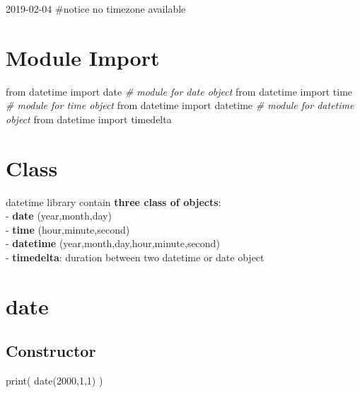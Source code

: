 \documentclass[
]{book}
\newenvironment{Shaded}{\begin{snugshade}}{\end{snugshade}}
\newcommand{\BuiltInTok}[1]{#1}
\newcommand{\CommentTok}[1]{\textcolor[rgb]{0.37,0.37,0.37}{\textit{#1}}}
\newcommand{\DecValTok}[1]{\textcolor[rgb]{0.06,0.06,0.06}{#1}}
\newcommand{\ImportTok}[1]{#1}
\newcommand{\NormalTok}[1]{#1}
\begin{document}
2019-02-04 \#notice no timezone available

\hypertarget{module-import}{%
\section{Module Import}\label{module-import}}

\begin{Shaded}
\begin{Highlighting}[]
\ImportTok{from}\NormalTok{ datetime }\ImportTok{import}\NormalTok{ date     }\CommentTok{# module for date object}
\ImportTok{from}\NormalTok{ datetime }\ImportTok{import}\NormalTok{ time     }\CommentTok{# module for time object}
\ImportTok{from}\NormalTok{ datetime }\ImportTok{import}\NormalTok{ datetime }\CommentTok{# module for datetime object}
\ImportTok{from}\NormalTok{ datetime }\ImportTok{import}\NormalTok{ timedelta}
\end{Highlighting}
\end{Shaded}

\hypertarget{class}{%
\section{Class}\label{class}}

datetime library contain \textbf{three class of objects}:\\
- \textbf{date} (year,month,day)\\
- \textbf{time} (hour,minute,second)\\
- \textbf{datetime} (year,month,day,hour,minute,second)\\
- \textbf{timedelta}: duration between two datetime or date object

\hypertarget{date-1}{%
\section{date}\label{date-1}}

\hypertarget{constructor-3}{%
\subsection{Constructor}\label{constructor-3}}

\begin{Shaded}
\begin{Highlighting}[]
\BuiltInTok{print}\NormalTok{( date(}\DecValTok{2000}\NormalTok{,}\DecValTok{1}\NormalTok{,}\DecValTok{1}\NormalTok{) )}
\end{Highlighting}
\end{Shaded}
\end{document}
